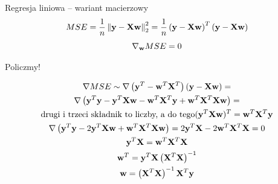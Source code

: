 \documentclass{sa}
\renewcommand{\vec}[1]{\ensuremath\mathbf{#1}}
\newcommand{\grad}{\ensuremath\nabla}
\begin{document}
\begin{frame}{Regresja liniowa -- wariant macierzowy}
\[ MSE = \frac{1}{n}\left\|\vec{y}-\vec{X}\vec{w}\right\|^2_2=\frac{1}{n}\left(\vec{y}-\vec{X}\vec{w}\right)^T\left(\vec{y}-\vec{X}\vec{w}\right) \]
\[ \grad_\vec{w}MSE = 0 \]

Policzmy!

{
\begin{gather*}
\grad MSE \sim \grad \left(\vec{y}^T-\vec{w}^T\vec{X}^T\right)\left(\vec{y}-\vec{X}\vec{w}\right) = \\
\grad \left(\vec{y}^T\vec{y}-\vec{y}^T\vec{X}\vec{w}-\vec{w}^T\vec{X}^T\vec{y}+\vec{w}^T\vec{X}^T\vec{X}\vec{w}\right) =\\
\text{drugi i trzeci składnik to liczby, a do tego} (\vec{y}^T\vec{X}\vec{w})^T=\vec{w}^T\vec{X}^T\vec{y}  \\
\grad \left(\vec{y}^T\vec{y}-2\vec{y}^T\vec{X}\vec{w}+\vec{w}^T\vec{X}^T\vec{X}\vec{w}\right) =2\vec{y}^T\vec{X}-2\vec{w}^T\vec{X}^T\vec{X}=0\\
\vec{y}^T\vec{X} = \vec{w}^T\vec{X}^T\vec{X} \\
\vec{w}^T = \vec{y}^T\vec{X}\left(\vec{X}^T\vec{X}\right)^{-1} \\
\vec{w} = \left(\vec{X}^T\vec{X}\right)^{-1}\vec{X}^T\vec{y}
\end{gather*}
}
\end{frame}
\end{document}
